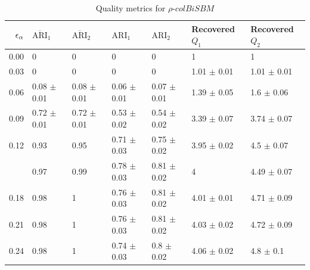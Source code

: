 \begin{table}[!h]

\caption{\label{tab:per_model_table}\label{tab:per_model_rho}Quality metrics for $\rho$$\text{-}colBiSBM$}
\centering
\begin{tabular}[t]{rllllll}
\toprule
$\eps[\alpha]$ & $\overline{\text{ARI}}_{1}$ & $\overline{\text{ARI}}_{2}$ & $\text{ARI}_{1}$ & $\text{ARI}_{2}$ & Recovered $Q_1$ & Recovered $Q_2$\\
\midrule
0.00 & 0 & 0 & 0 & 0 & 1 & 1\\
0.03 & 0 & 0 & 0 & 0 & 1.01 $\pm$ 0.01 & 1.01 $\pm$ 0.01\\
0.06 & 0.08 $\pm$ 0.01 & 0.08 $\pm$ 0.01 & 0.06 $\pm$ 0.01 & 0.07 $\pm$ 0.01 & 1.39 $\pm$ 0.05 & 1.6 $\pm$ 0.06\\
0.09 & 0.72 $\pm$ 0.01 & 0.72 $\pm$ 0.01 & 0.53 $\pm$ 0.02 & 0.54 $\pm$ 0.02 & 3.39 $\pm$ 0.07 & 3.74 $\pm$ 0.07\\
0.12 & 0.93 & 0.95 & 0.71 $\pm$ 0.03 & 0.75 $\pm$ 0.02 & 3.95 $\pm$ 0.02 & 4.5 $\pm$ 0.07\\
\addlinespace
0.15 & 0.97 & 0.99 & 0.78 $\pm$ 0.03 & 0.81 $\pm$ 0.02 & 4 & 4.49 $\pm$ 0.07\\
0.18 & 0.98 & 1 & 0.76 $\pm$ 0.03 & 0.81 $\pm$ 0.02 & 4.01 $\pm$ 0.01 & 4.71 $\pm$ 0.09\\
0.21 & 0.98 & 1 & 0.76 $\pm$ 0.03 & 0.81 $\pm$ 0.02 & 4.03 $\pm$ 0.02 & 4.72 $\pm$ 0.09\\
0.24 & 0.98 & 1 & 0.74 $\pm$ 0.03 & 0.8 $\pm$ 0.02 & 4.06 $\pm$ 0.02 & 4.8 $\pm$ 0.1\\
\bottomrule
\end{tabular}
\end{table}
